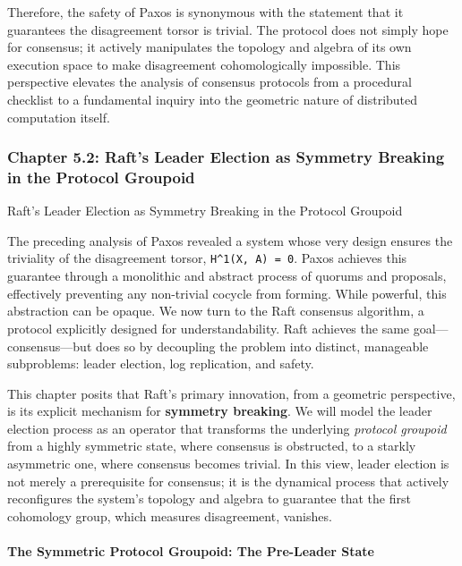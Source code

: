 \documentclass[
]{article}
\begin{document}
Therefore, the safety of Paxos is synonymous with the statement that it
guarantees the disagreement torsor is trivial. The protocol does not
simply hope for consensus; it actively manipulates the topology and
algebra of its own execution space to make disagreement cohomologically
impossible. This perspective elevates the analysis of consensus
protocols from a procedural checklist to a fundamental inquiry into the
geometric nature of distributed computation itself.

\subsubsection{Chapter 5.2: Raft's Leader Election as Symmetry Breaking
in the Protocol
Groupoid}\label{chapter-5.2-rafts-leader-election-as-symmetry-breaking-in-the-protocol-groupoid}

\protect{}\label{chapter-5-2-Raft_s_Leader_Election_as_Symmetry_Break}{}

Raft's Leader Election as Symmetry Breaking in the Protocol Groupoid

The preceding analysis of Paxos revealed a system whose very design
ensures the triviality of the disagreement torsor,
\texttt{H\^{}1(X,\ A)\ =\ 0}. Paxos achieves this guarantee through a
monolithic and abstract process of quorums and proposals, effectively
preventing any non-trivial cocycle from forming. While powerful, this
abstraction can be opaque. We now turn to the Raft consensus algorithm,
a protocol explicitly designed for understandability. Raft achieves the
same goal---consensus---but does so by decoupling the problem into
distinct, manageable subproblems: leader election, log replication, and
safety.

This chapter posits that Raft's primary innovation, from a geometric
perspective, is its explicit mechanism for \textbf{symmetry breaking}.
We will model the leader election process as an operator that transforms
the underlying \emph{protocol groupoid} from a highly symmetric state,
where consensus is obstructed, to a starkly asymmetric one, where
consensus becomes trivial. In this view, leader election is not merely a
prerequisite for consensus; it is the dynamical process that actively
reconfigures the system's topology and algebra to guarantee that the
first cohomology group, which measures disagreement, vanishes.

\paragraph{The Symmetric Protocol Groupoid: The Pre-Leader
State}\label{the-symmetric-protocol-groupoid-the-pre-leader-state}
\end{document}
